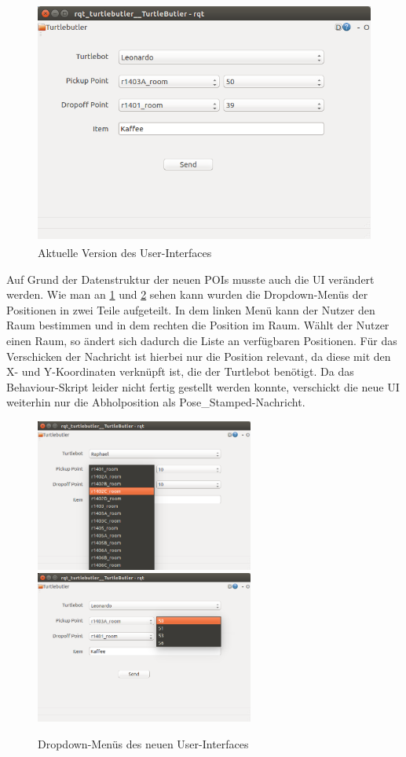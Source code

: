 \documentclass[a4paper,12pt,headsepline]{scrartcl}
\begin{document}
		\begin{figure} [H]
			\centering
			\includegraphics[height=8cm]{Images/Turtlebutler_Used.png}
			\caption{Aktuelle Version des User-Interfaces}
			\label{fig:NewUI}
		\end{figure}
		Auf Grund der Datenstruktur der neuen POIs musste auch die UI verändert werden. Wie man an \cref{fig:NewUI} und \cref{fig:NewUIDropdown} sehen kann wurden die Dropdown-Menüs der Positionen in zwei Teile aufgeteilt. In dem linken Menü kann der Nutzer den Raum bestimmen und in dem rechten die Position im Raum. Wählt der Nutzer einen Raum, so ändert sich dadurch die Liste an verfügbaren Positionen. Für das Verschicken der Nachricht ist hierbei nur die Position relevant, da diese mit den X- und Y-Koordinaten verknüpft ist, die der Turtlebot benötigt. Da das Behaviour-Skript leider nicht fertig gestellt werden konnte, verschickt die neue UI weiterhin nur die Abholposition als \glqq Pose{\_}Stamped\grqq-Nachricht.
		\begin{figure} [H]
			\centering
			\includegraphics[height=5cm]{Images/Turtlebutler_Rooms.png}
			\includegraphics[height=5cm]{Images/Turtlebutler_Positions.png}
			\caption{Dropdown-Menüs des neuen User-Interfaces}
			\label{fig:NewUIDropdown}
		\end{figure}
	
\end{document}
